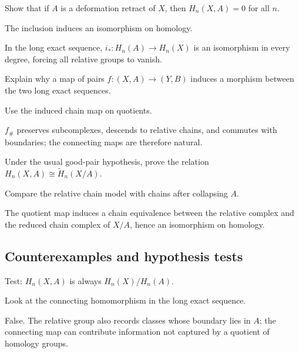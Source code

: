 \begin{exercise}\label{exr:viii19-ped-07}
Show that if $A$ is a deformation retract of $X$, then $H_n(X,A)=0$ for all $n$.
\end{exercise}
\begin{hint}
The inclusion induces an isomorphism on homology.
\end{hint}
\begin{solution}
In the long exact sequence, $i_*:H_n(A)\to H_n(X)$ is an isomorphism in every degree, forcing all relative groups to vanish.
\end{solution}

\begin{exercise}[Naturality]\label{exr:viii19-ped-08}
Explain why a map of pairs $f:(X,A)\to(Y,B)$ induces a morphism between the two long exact sequences.
\end{exercise}
\begin{hint}
Use the induced chain map on quotients.
\end{hint}
\begin{solution}
$f_\#$ preserves subcomplexes, descends to relative chains, and commutes with boundaries; the connecting maps are therefore natural.
\end{solution}

\begin{exercise}\label{exr:viii19-ped-09}
Under the usual good-pair hypothesis, prove the relation $H_n(X,A)\cong\widetilde H_n(X/A)$.
\end{exercise}
\begin{hint}
Compare the relative chain model with chains after collapsing $A$.
\end{hint}
\begin{solution}
The quotient map induces a chain equivalence between the relative complex and the reduced chain complex of $X/A$, hence an isomorphism on homology.
\end{solution}

\subsection*{Counterexamples and hypothesis tests}

\begin{exercise}\label{exr:viii19-ped-10}
Test: $H_n(X,A)$ is always $H_n(X)/H_n(A)$.
\end{exercise}
\begin{hint}
Look at the connecting homomorphism in the long exact sequence.
\end{hint}
\begin{solution}
False. The relative group also records classes whose boundary lies in $A$; the connecting map can contribute information not captured by a quotient of homology groups.
\end{solution}


